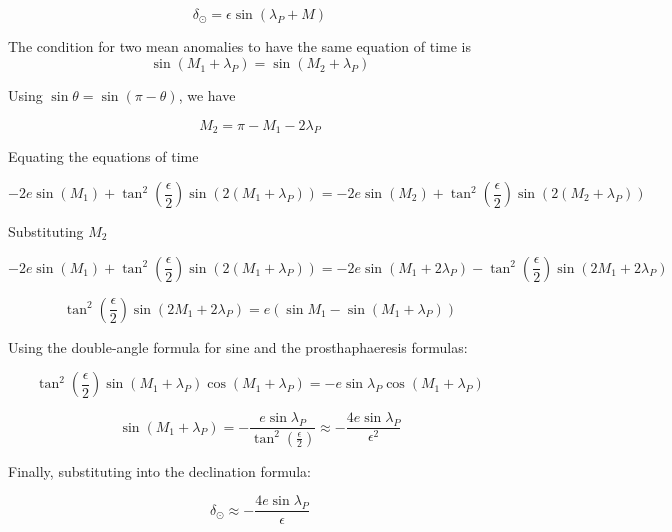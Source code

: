 \documentclass[11pt]{article}
\begin{document}
\begin{pproblem}
\begin{pssolution*}{}{ }
\begin{alternativas}
        \[\boxed{\delta_\odot = \epsilon\sin(\lambda_P + M)}\]

        \item The condition for two mean anomalies to have the same equation of time is 
        \[\sin(M_1+\lambda_P) = \sin(M_2+\lambda_P)\]

        Using \(\sin\theta = \sin(\pi-\theta)\), we have

        \[\boxed{M_2 =\pi -M_1-2\lambda_P}\]

        \item Equating the equations of time
        
        \[-2e\sin(M_1) + \tan^2 \left( \frac{\epsilon}{2} \right)\sin\left(2(M_1 + \lambda_P) \right) = -2e\sin(M_2) + \tan^2 \left( \frac{\epsilon}{2} \right)\sin\left(2(M_2 + \lambda_P) \right)\]

        Substituting \(M_2\)  

        \[-2e\sin(M_1) + \tan^2 \left( \frac{\epsilon}{2} \right)\sin\left(2(M_1 + \lambda_P) \right) = -2e\sin(M_1+2\lambda_P) - \tan^2 \left( \frac{\epsilon}{2} \right)\sin\left(2M_1 + 2\lambda_P \right)\]

        \[\tan^2 \left( \frac{\epsilon}{2} \right)\sin(2M_1+2\lambda_P) = e(\sin M_1 - \sin(M_1+\lambda_P))\]

        Using the double-angle formula for sine and the prosthaphaeresis formulas:

        \[\tan^2\left(\frac{\epsilon}{2}\right)\sin(M_1+\lambda_P)\cos(M_1+\lambda_P) = -e\sin\lambda_P\cos(M_1+\lambda_P)\]

        \[\sin(M_1+\lambda_P) = -\frac{e\sin\lambda_P}{\tan^2\left(\frac{\epsilon}{2}\right)}\approx -\frac{4e\sin\lambda_P}{\epsilon^2}\]

        Finally, substituting into the declination formula:

        \[\boxed{\delta_\odot \approx -\frac{4e\sin\lambda_P}{\epsilon}}\]
    \end{alternativas}
\end{pssolution*}
\end{pproblem}
\end{document}

